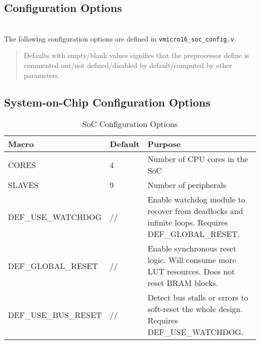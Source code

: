\begin{appendices}
\chapter{Configuration Options}
\label{sect:config}
\startcontents[chapters]

\noindent\\
The following configuration options are defined in \verb|vmicro16_soc_config.v|.

\begin{quote}
Defaults with empty/blank values signifies that the preprocessor define is commented out/not defined/disabled by default/computed by other parameters.
\end{quote}

\section{System-on-Chip Configuration Options}
\begin{table}[H]
\centering
\label{tab:isa}
\begin{tabularx}{\textwidth}{l|l|p{8cm}}
Macro      & Default & Purpose                         \\ 
\hline
CORES  & 4       & Number of CPU cores in the SoC  \\
SLAVES & 9       & Number of peripherals  \\    
DEF\_USE\_WATCHDOG & //  & Enable watchdog module to recover from deadlocks and infinite loops. Requires DEF\_GLOBAL\_RESET. \\
DEF\_GLOBAL\_RESET           & //      & Enable synchronous reset logic. Will consume more LUT resources. Does not reset BRAM blocks.\\
DEF\_USE\_BUS\_RESET & //      & Detect bus stalls or errors to soft-reset the whole design. Requires DEF\_USE\_WATCHDOG.\\
\end{tabularx}
\caption{SoC Configuration Options}
\end{table}


\end{appendices}
